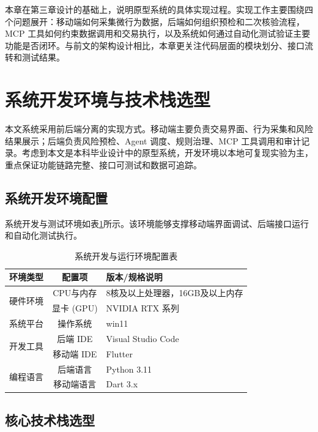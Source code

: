 \documentclass{xduugthesis}
\begin{document}
本章在第三章设计的基础上，说明原型系统的具体实现过程。实现工作主要围绕四个问题展开：移动端如何采集微行为数据，后端如何组织预检和二次核验流程，MCP 工具如何约束数据调用和交易执行，以及系统如何通过自动化测试验证主要功能是否闭环。与前文的架构设计相比，本章更关注代码层面的模块划分、接口流转和测试结果。

\section{系统开发环境与技术栈选型}

本文系统采用前后端分离的实现方式。移动端主要负责交易界面、行为采集和风险结果展示；后端负责风险预检、Agent 调度、规则治理、MCP 工具调用和审计记录。考虑到本文是本科毕业设计中的原型系统，开发环境以本地可复现实验为主，重点保证功能链路完整、接口可测试和数据可追踪。

\subsection{系统开发环境配置}

系统开发与测试环境如表\ref{tab:dev-env}所示。该环境能够支撑移动端界面调试、后端接口运行和自动化测试执行。

\begin{table}[H]
    \centering
    \caption{系统开发与运行环境配置表}
    \label{tab:dev-env}
    \begin{tabular}{|c|c|p{6cm}|}
        \hline
        环境类型 & 配置项 & 版本/规格说明 \\
        \hline
        \multirow{2}{*}{硬件环境} & CPU与内存 & 8核及以上处理器，16GB及以上内存 \\
        \cline{2-3}
        & 显卡 (GPU) & NVIDIA RTX 系列 \\
        \hline
        系统平台 & 操作系统 & win11 \\
        \hline
        \multirow{2}{*}{开发工具} & 后端 IDE & Visual Studio Code\\
        \cline{2-3}
        & 移动端 IDE & Flutter \\
        \hline
        \multirow{2}{*}{编程语言} & 后端语言 & Python 3.11\\
        \cline{2-3}
        & 移动端语言 & Dart 3.x\\
        \hline
    \end{tabular}
\end{table}

\subsection{核心技术栈选型}
\end{document}
